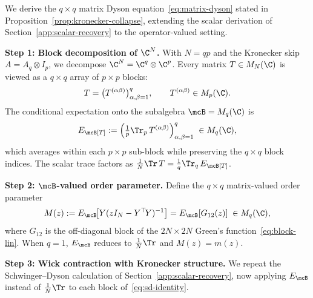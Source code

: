 We derive the $q \times q$ matrix Dyson equation~\eqref{eq:matrix-dyson} stated in Proposition~\ref{prop:kronecker-collapse}, extending the scalar derivation of Section~\ref{app:scalar-recovery} to the operator-valued setting.

\medskip
\noindent\textbf{Step 1: Block decomposition of $\C^N$.}
With $N = qp$ and the Kronecker skip $A = A_q \otimes I_p$, we decompose $\C^N = \C^q \otimes \C^p$. Every matrix $T \in M_N(\C)$ is viewed as a $q \times q$ array of $p \times p$ blocks:
\[
T = \bigl(T^{(\alpha\beta)}\bigr)_{\alpha,\beta=1}^q, \qquad T^{(\alpha\beta)} \in M_p(\C).
\]
The conditional expectation onto the subalgebra $\mcB = M_q(\C)$ is
\begin{equation}\label{eq:cond-exp}
E_\mcB[T] := \Bigl(\tfrac{1}{p}\Tr_p\, T^{(\alpha\beta)}\Bigr)_{\alpha,\beta=1}^q \;\in M_q(\C),
\end{equation}
which averages within each $p \times p$ sub-block while preserving the $q \times q$ block indices. The scalar trace factors as $\frac{1}{N}\Tr\, T = \frac{1}{q}\Tr_q\, E_\mcB[T]$.

\medskip
\noindent\textbf{Step 2: $\mcB$-valued order parameter.}
Define the $q \times q$ matrix-valued order parameter
\begin{equation}\label{eq:M-def}
M(z) := E_\mcB\!\bigl[Y(zI_N - Y^\top\! Y)^{-1}\bigr] = E_\mcB[G_{12}(z)] \;\in M_q(\C),
\end{equation}
where $G_{12}$ is the off-diagonal block of the $2N \times 2N$ Green's function~\eqref{eq:block-lin}. When $q = 1$, $E_\mcB$ reduces to $\frac{1}{N}\Tr$ and $M(z) = m(z)$.

\medskip
\noindent\textbf{Step 3: Wick contraction with Kronecker structure.}
We repeat the Schwinger--Dyson calculation of Section~\ref{app:scalar-recovery}, now applying $E_\mcB$ instead of $\frac{1}{N}\Tr$ to each block of~\eqref{eq:sd-identity}.

